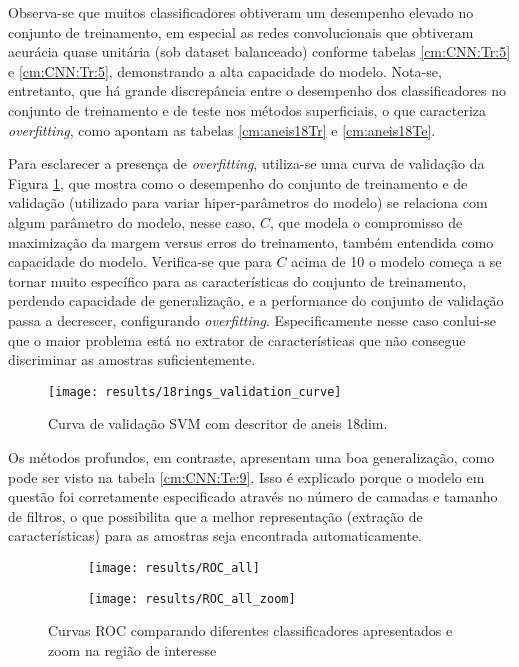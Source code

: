 Observa-se que muitos classificadores obtiveram um desempenho elevado no conjunto de treinamento, em especial as redes convolucionais que obtiveram acurácia quase unitária (sob dataset balanceado) conforme tabelas \ref{cm:CNN:Tr:5} e \ref{cm:CNN:Tr:5}, demonstrando a alta capacidade do modelo. Nota-se, entretanto, que há grande discrepância entre o desempenho dos classificadores no conjunto de treinamento e de teste nos métodos superficiais, o que caracteriza \textit{overfitting}, como apontam as tabelas \ref{cm:aneis18Tr} e \ref{cm:aneis18Te}. 

Para esclarecer a presença de \textit{overfitting}, utiliza-se uma curva de validação da Figura \ref{fig:validation-curve}, que mostra como o desempenho do conjunto de treinamento e de validação (utilizado para variar hiper-parâmetros do modelo) se relaciona com algum parâmetro do modelo, nesse caso, $C$, que modela o compromisso de maximização da margem versus erros do treinamento, também entendida como capacidade do modelo. Verifica-se que para $C$ acima de 10 o modelo começa a se tornar muito específico para as características do conjunto de treinamento, perdendo capacidade de generalização, e a performance do conjunto de validação passa a decrescer, configurando \textit{overfitting}. Especificamente nesse caso conlui-se que o maior problema está no extrator de características que não consegue discriminar as amostras suficientemente.

\begin{figure}
  \centering
  \texttt{[image: results/18rings\_validation\_curve]}
  \caption{Curva de validação SVM com descritor de aneis 18dim.}
  \label{fig:validation-curve}
\end{figure}

Os métodos profundos, em contraste, apresentam uma boa generalização, como pode ser visto na tabela \ref{cm:CNN:Te:9}. Isso é explicado porque o modelo em questão foi corretamente especificado através no número de camadas e tamanho de filtros, o que possibilita que a melhor representação (extração de características) para as amostras seja encontrada automaticamente.

\begin{figure}
\centering
\begin{subfigure}{.5\textwidth}
  \centering
  \texttt{[image: results/ROC\_all]}
\end{subfigure}%
\begin{subfigure}{.5\textwidth}
  \centering
  \texttt{[image: results/ROC\_all\_zoom]}
\end{subfigure}
\caption{Curvas ROC comparando diferentes classificadores apresentados e zoom na região de interesse}
\label{fig:ROC}
\end{figure}

